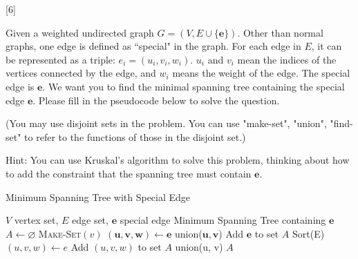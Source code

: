 [6]

Given a weighted undirected graph $G=(V, E\cup\{\mathbf{e}\})$. Other than normal graphs, one edge is defined as ``special" in the graph. For each edge in $E$, it can be represented as a triple: $e_i = (u_i,v_i,w_i)$. $u_i$ and $v_i$ mean the indices of the vertices connected by the edge, and $w_i$ means the weight of the edge. The special edge is $\mathbf{e}$. We want you to find the minimal spanning tree containing the special edge $\mathbf{e}$. Please fill in the pseudocode below to solve the question.

(You may use disjoint sets in the problem. You can use "make-set", "union", "find-set" to refer to the functions of those in the disjoint set.)

Hint: You can use Kruskal's algorithm to solve this problem, thinking about how to add the constraint that the spanning tree must contain $\mathbf{e}$.
\begin{algorithm}
    \caption{Minimum Spanning Tree with Special Edge}
    \begin{algorithmic}[1]
        \REQUIRE $V$ vertex set, $E$ edge set, $\mathbf{e}$ special edge
        \ENSURE Minimum Spanning Tree containing $\mathbf{e}$
        \STATE $A \gets \varnothing$
        \STATE \textsc{Make-Set}$(v)$
        \ENDFOR
        \STATE $ (\mathbf u, \mathbf v, \mathbf w) \gets \mathbf{e} $
        \STATE union($\mathbf u, \mathbf v$)
        \STATE Add $\mathbf{e}$ to set $A$
        \STATE Sort(E) 
        \STATE $(u, v, w)\gets e$
        \STATE Add $(u, v, w)$ to set $A$
        \STATE union(u, v)
        \ENDIF
        \ENDFOR
        \RETURN $A$
    \end{algorithmic}
\end{algorithm}